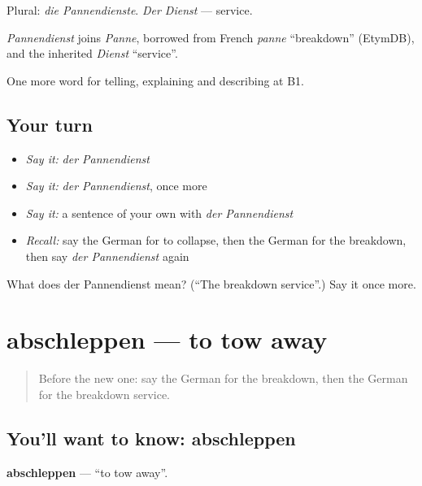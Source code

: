 Plural: \emph{die Pannendienste}. \emph{Der Dienst} — service.

\begin{cousinweb}
\emph{Pannendienst} joins \emph{Panne}, borrowed from French \emph{panne} \textquotedblleft{}breakdown\textquotedblright{} (EtymDB), and the inherited \emph{Dienst} \textquotedblleft{}service\textquotedblright{}.
\end{cousinweb}

\begin{grammarlens}[title={What you've built}]
One more word for telling, explaining and describing at B1.
\end{grammarlens}

\subsection*{Your turn}
\begin{itemize}
\raggedright
  \item \emph{Say it:} \emph{der Pannendienst}
  \item \emph{Say it:} \emph{der Pannendienst}, once more
  \item \emph{Say it:} a sentence of your own with \emph{der Pannendienst}
  \item \emph{Recall:} say the German for to collapse, then the German for the breakdown, then say \emph{der Pannendienst} again
\end{itemize}

\begin{tcolorbox}[breakable,colback=teal!4,colframe=teal!35!black,title={Before you move on}]
What does der Pannendienst mean? (\textquotedblleft{}The breakdown service\textquotedblright{}.) Say it once more.
\end{tcolorbox}
\section[abschleppen]{abschleppen — to tow away}

\label{lesson:GE-C295-abschleppen}



\begin{quote}
Before the new one: say the German for the breakdown, then the German for the breakdown service.
\end{quote}

\subsection*{You'll want to know: abschleppen}
\textbf{abschleppen} — \textquotedblleft{}to tow away\textquotedblright{}.

